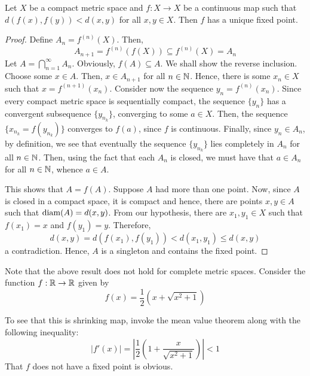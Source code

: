 \begin{theorem}
    Let $X$ be a compact metric space and $f: X\to X$ be a continuous map such that $d(f(x), f(y)) < d(x,y)$ for all $x,y\in X$. Then $f$ has a unique fixed point.
\end{theorem}
\begin{proof}
    Define $A_n = f^{(n)}(X)$. Then, 
    \begin{equation*}
        A_{n + 1} = f^{(n)}(f(X))\subseteq f^{(n)}(X) = A_n
    \end{equation*}
    Let $A = \bigcap\limits_{n = 1}^\infty A_n$. Obviously, $f(A)\subseteq A$. We shall show the reverse inclusion. Choose some $x\in A$. Then, $x\in A_{n + 1}$ for all $n\in\mathbb{N}$. Hence, there is some $x_n\in X$ such that $x = f^{(n + 1)}(x_n)$. Consider now the sequence $y_n = f^{(n)}(x_n)$. Since every compact metric space is sequentially compact, the sequence $\{y_n\}$ has a convergent subsequence $\{y_{n_k}\}$, converging to some $a\in X$. Then, the sequence $\{x_{n_k} = f(y_{n_k})\}$ converges to $f(a)$, since $f$ is continuous. Finally, since $y_n\in A_n$, by definition, we see that eventually the sequence $\{y_{n_k}\}$ lies completely in $A_n$ for all $n\in\mathbb{N}$. Then, using the fact that each $A_n$ is closed, we must have that $a\in A_n$ for all $n\in\mathbb{N}$, whence $a\in A$.

    This shows that $A = f(A)$. Suppose $A$ had more than one point. Now, since $A$ is closed in a compact space, it is compact and hence, there are points $x,y\in A$ such that $\operatorname{diam}(A) = d(x,y)$. From our hypothesis, there are $x_1,y_1\in X$ such that $f(x_1) = x$ and $f(y_1) = y$. Therefore, 
    \begin{equation*}
        d(x,y) = d(f(x_1), f(y_1)) < d(x_1, y_1)\le d(x,y)
    \end{equation*}
    a contradiction. Hence, $A$ is a singleton and contains the fixed point.
\end{proof}

Note that the above result does not hold for complete metric spaces. Consider the function $f:\mathbb{R}\to\mathbb{R}$ given by 
\begin{equation*}
    f(x) = \frac{1}{2}(x + \sqrt{x^2 + 1})
\end{equation*}

To see that this is shrinking map, invoke the mean value theorem along with the following inequality:
\begin{equation*}
    |f'(x)| = \left|\frac{1}{2}\left(1 + \frac{x}{\sqrt{x^2 + 1}}\right)\right| < 1
\end{equation*}
That $f$ does not have a fixed point is obvious.


